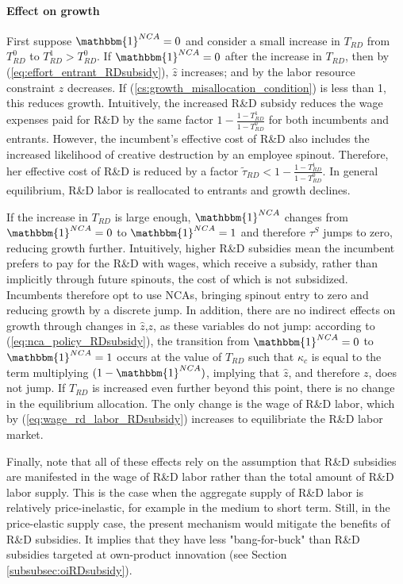 \documentclass[11pt,english]{article}
\begin{document}
\paragraph{Effect on growth}

First suppose $\mathbbm{1}^{NCA} = 0$ and consider a small increase in $T_{RD}$ from $T_{RD}^0$ to $T_{RD}^1 > T_{RD}^0$. If $\mathbbm{1}^{NCA} = 0$ after the increase in $T_{RD}$, then by (\ref{eq:effort_entrant_RDsubsidy}), $\hat{z}$ increases; and by the labor resource constraint $z$ decreases. If (\ref{cs:growth_misallocation_condition}) is less than 1, this reduces growth. Intuitively, the increased R\&D subsidy reduces the wage expenses paid for R\&D by the same factor $1-\frac{1-T_{RD}^1}{1-T_{RD}^0}$ for both incumbents and entrants. However, the incumbent's effective cost of R\&D also includes the increased likelihood of creative destruction by an employee spinout. Therefore, her effective cost of R\&D is reduced by a factor $\tilde{\tau}_{RD} < 1-\frac{1-T_{RD}^1}{1-T_{RD}^0}$. In general equilibrium, R\&D labor is reallocated to entrants and growth declines.

If the increase in $T_{RD}$ is large enough, $\mathbbm{1}^{NCA}$ changes from $\mathbbm{1}^{NCA} = 0$ to $\mathbbm{1}^{NCA} = 1$ and therefore $\tau^S$ jumps to zero, reducing growth further. Intuitively, higher R\&D subsidies mean the incumbent prefers to pay for the R\&D with wages, which receive a subsidy, rather than implicitly through future spinouts, the cost of which is not subsidized. Incumbents therefore opt to use NCAs, bringing spinout entry to zero and reducing growth by a discrete jump. In addition, there are no indirect effects on growth through changes in $\hat{z}$,$z$, as these variables do not jump: according to (\ref{eq:nca_policy_RDsubsidy}), the transition from $\mathbbm{1}^{NCA} = 0$ to $\mathbbm{1}^{NCA} =1$ occurs at the value of $T_{RD}$ such that $\kappa_c$ is equal to the term multiplying $(1-\mathbbm{1}^{NCA})$, implying that $\hat{z}$, and therefore $z$, does not jump. If $T_{RD}$ is increased even further beyond this point, there is no change in the equilibrium allocation. The only change is the wage of R\&D labor, which by (\ref{eq:wage_rd_labor_RDsubsidy}) increases to equilibriate the R\&D labor market.

Finally, note that all of these effects rely on the assumption that R\&D subsidies are manifested in the wage of R\&D labor rather than the total amount of R\&D labor supply. This is the case when the aggregate supply of R\&D labor is relatively price-inelastic, for example in the medium to short term. Still, in the price-elastic supply case, the present mechanism would mitigate the benefits of R\&D subsidies. It implies that they have less "bang-for-buck" than R\&D subsidies targeted at own-product innovation (see Section \ref{subsubsec:oiRDsubsidy}). 
\end{document}
